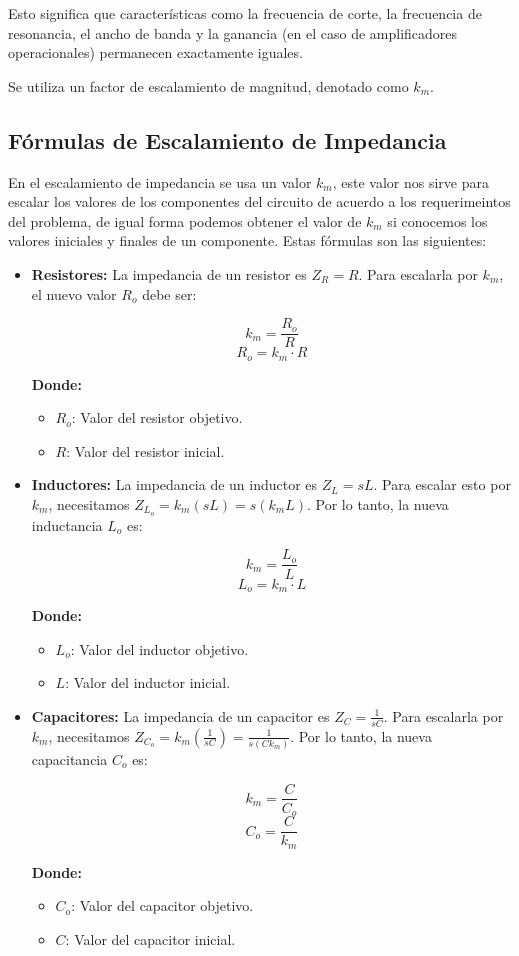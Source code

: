 \documentclass[12pt, letterpaper]{article}
\begin{document}
Esto significa que características como la frecuencia de corte, la frecuencia de resonancia, el ancho de banda y la ganancia (en el caso de amplificadores operacionales) permanecen exactamente iguales.

Se utiliza un factor de escalamiento de magnitud, denotado como \(k_m\).

\subsection*{Fórmulas de Escalamiento de Impedancia}

En el escalamiento de impedancia se usa un valor \(k_m\), este valor nos sirve para escalar los valores de los componentes del circuito de acuerdo a los requerimeintos del problema, de igual forma podemos obtener el valor de \(k_m\) si conocemos los valores iniciales y finales de un componente. Estas fórmulas son las siguientes:

\begin{itemize}
    \item \textbf{Resistores:} La impedancia de un resistor es \(Z_R = R\). Para escalarla por \(k_m\), el nuevo valor \(R_o\) debe ser:

    \[k_m = \frac{R_o}{R} \]
    \[ R_o = k_m \cdot R \]

    \textbf{Donde:}
    \begin{itemize}
        \item \(R_o\): Valor del resistor objetivo.
        \item \(R\): Valor del resistor inicial.
    \end{itemize}

    \item \textbf{Inductores:} La impedancia de un inductor es \(Z_L = sL\). Para escalar esto por \(k_m\), necesitamos \(Z_{L_o} = k_m (sL) = s (k_mL)\). Por lo tanto, la nueva inductancia \(L_o\) es:

    \[k_m = \frac{L_o}{L} \]
    \[ L_o = k_m \cdot L \]

    \textbf{Donde:}
    \begin{itemize}
        \item \(L_o\): Valor del inductor objetivo.
        \item \(L\): Valor del inductor inicial.
    \end{itemize}

    \item \textbf{Capacitores:} La impedancia de un capacitor es \(Z_C = \frac{1}{s C}\). Para escalarla por \(k_m\), necesitamos \(Z_{C_o} = k_m \left( \frac{1}{s C} \right) = \frac{1}{s (C k_m)}\). Por lo tanto, la nueva capacitancia \(C_o\) es:

    \[k_m = \frac{C}{C_o} \]
    \[C_o = \frac{C}{k_m} \]

    \textbf{Donde:}
    \begin{itemize}
        \item \(C_o\): Valor del capacitor objetivo.
        \item \(C\): Valor del capacitor inicial.
    \end{itemize}
\end{itemize}
\end{document}
